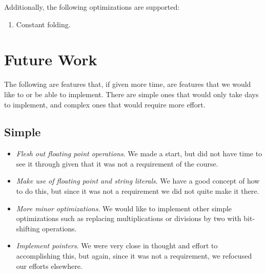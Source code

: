 \documentclass{article}
\begin{document}
Additionally, the following optimizations are supported:
  \begin{enumerate}
  \item Constant folding.
  \end{enumerate}


\section{Future Work}
The following are features that, if given more time, are features that we would
like to or be able to implement. There are simple ones that would only take days
to implement, and complex ones that would require more effort.

\subsection{Simple}
  \begin{itemize}
  \item \textit{Flesh out floating point operations}. We made a start, but did
        not have time to see it through given that it was not a requirement
        of the course.

  \item \textit{Make use of floating point and string literals}. We have a good
        concept of how to do this, but since it was not a requirement we did
        not quite make it there.

  \item \textit{More minor optimizations}. We would like to implement other
        simple optimizations such as replacing multiplications or divisions
        by two with bit-shifting operations.

  \item \textit{Implement pointers}. We were very close in thought and effort
        to accomplishing this, but again, since it was not a requirement, we
        refocused our efforts elsewhere. 
  \end{itemize}
\end{document}
